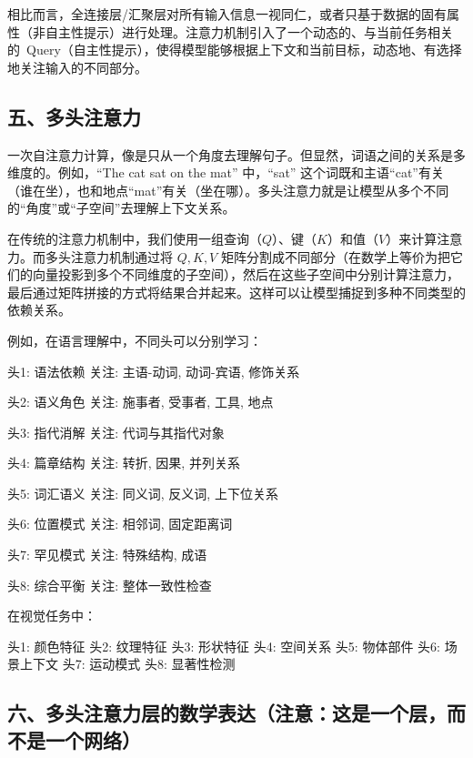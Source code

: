 相比而言，全连接层/汇聚层对所有输入信息一视同仁，或者只基于数据的固有属性（非自主性提示）进行处理。注意力机制引入了一个动态的、与当前任务相关的~Query（自主性提示），使得模型能够根据上下文和当前目标，动态地、有选择地关注输入的不同部分。

\hypertarget{ux4e94ux591aux5934ux6ce8ux610fux529b}{%
\subsection{五、多头注意力}\label{ux4e94ux591aux5934ux6ce8ux610fux529b}}

一次自注意力计算，像是只从一个角度去理解句子。但显然，词语之间的关系是多维度的。例如，``The cat sat on the mat'' 中，``sat'' 这个词既和主语``cat''有关（谁在坐），也和地点``mat''有关（坐在哪）。多头注意力就是让模型从多个不同的``角度''或``子空间''去理解上下文关系。

在传统的注意力机制中，我们使用一组查询（\(Q\)）、键（\(K\)）和值（\(V\)）来计算注意力。而多头注意力机制通过将 \(Q,K,V\) 矩阵分割成不同部分（在数学上等价为把它们的向量投影到多个不同维度的子空间），然后在这些子空间中分别计算注意力，最后通过矩阵拼接的方式将结果合并起来。这样可以让模型捕捉到多种不同类型的依赖关系。

例如，在语言理解中，不同头可以分别学习：

头1: 语法依赖 关注: 主语-动词, 动词-宾语, 修饰关系

头2: 语义角色 关注: 施事者, 受事者, 工具, 地点

头3: 指代消解 关注: 代词与其指代对象

头4: 篇章结构 关注: 转折, 因果, 并列关系

头5: 词汇语义 关注: 同义词, 反义词, 上下位关系

头6: 位置模式 关注: 相邻词, 固定距离词

头7: 罕见模式 关注: 特殊结构, 成语

头8: 综合平衡 关注: 整体一致性检查

在视觉任务中：

头1: 颜色特征 头2: 纹理特征 头3: 形状特征 头4: 空间关系 头5: 物体部件 头6: 场景上下文 头7: 运动模式 头8: 显著性检测

\hypertarget{ux516dux591aux5934ux6ce8ux610fux529bux5c42ux7684ux6570ux5b66ux8868ux8fbeux6ce8ux610fux8fd9ux662fux4e00ux4e2aux5c42ux800cux4e0dux662fux4e00ux4e2aux7f51ux7edc}{%
\subsection{六、多头注意力层的数学表达（注意：这是一个层，而不是一个网络）}\label{ux516dux591aux5934ux6ce8ux610fux529bux5c42ux7684ux6570ux5b66ux8868ux8fbeux6ce8ux610fux8fd9ux662fux4e00ux4e2aux5c42ux800cux4e0dux662fux4e00ux4e2aux7f51ux7edc}}

